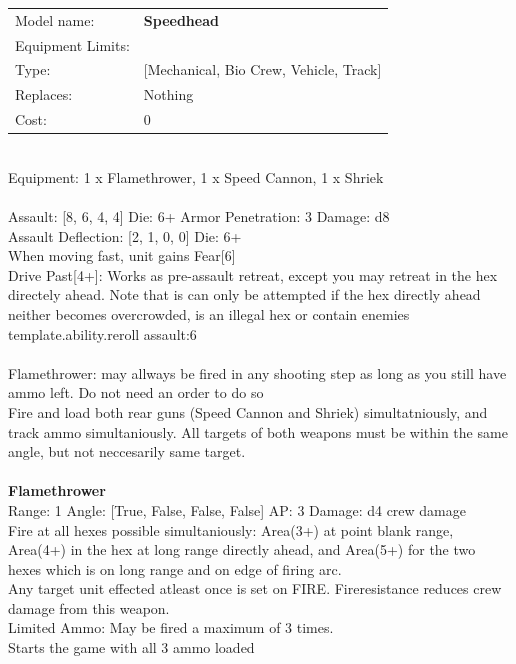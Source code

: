 \noindent
\begin{tabular}{ll}
Model name: &{\bf Speedhead } \\
Equipment Limits: & \\
Type: &[Mechanical, Bio Crew, Vehicle, Track] \\
Replaces: &Nothing \\
Cost: & 0\\
\end{tabular}
\ \\
Equipment: 1 x Flamethrower, 1 x Speed Cannon, 1 x Shriek \\
\ \\
Assault: [8, 6, 4, 4] Die: 6+ Armor Penetration: 3 Damage: d8 \\
Assault Deflection: [2, 1, 0, 0] Die: 6+\\
\indent When moving fast, unit gains Fear[6]\\ 
Drive Past[4+]: Works as pre-assault retreat, except you may retreat in the hex directely ahead. Note that is can only be attempted if the hex directly ahead neither becomes overcrowded, is an illegal hex or contain enemies\\ 
{template.ability.reroll assault:6}\\ 
 
\ \\
Flamethrower: may allways be fired in any shooting step as long as you still have ammo left. Do not need an order to do so\\ 
Fire and load both rear guns (Speed Cannon and Shriek) simultatniously, and track ammo simultaniously. All targets of both weapons must be within the same angle, but not neccesarily same target.\\ 

\ \\
{\bf Flamethrower } \\



Range: 1  Angle: [True, False, False, False] AP: 3 Damage: d4 crew damage \\
Fire at all hexes possible simultaniously: Area(3+) at point blank range, Area(4+) in the hex at long range directly ahead, and Area(5+) for the two hexes which is on long range and on edge of firing arc. \\ 
 Any target unit effected atleast once is set on FIRE. Fireresistance reduces crew damage from this weapon. \\ 
Limited Ammo: May be fired a maximum of 3 times. \\ 
 Starts the game with all 3 ammo loaded\\ 





